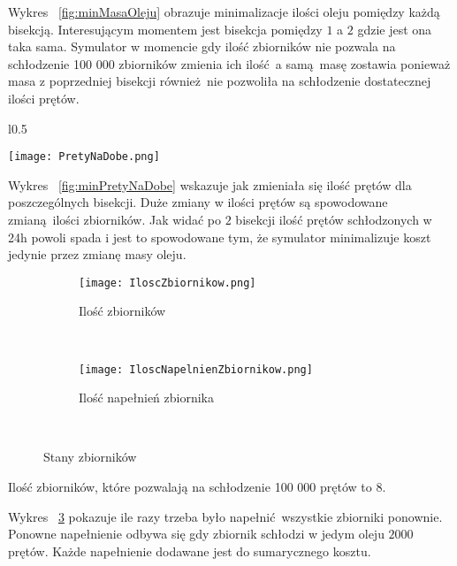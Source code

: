 \documentclass[varwidth,12pt,a4paper]{article}
\begin{document}
Wykres ~\ref{fig:minMasaOleju} obrazuje minimalizacje ilości oleju pomiędzy każdą bisekcją.
Interesującym momentem jest bisekcja pomiędzy $1$ a $2$ gdzie jest ona taka sama. Symulator w momencie 
gdy ilość zbiorników nie pozwala na schłodzenie 100 000 zbiorników zmienia ich ilość a samą masę
zostawia ponieważ masa z poprzedniej bisekcji również nie pozwoliła na schłodzenie dostatecznej
ilości prętów.
\newpage

\afterpage{\clearpage}

\begin{wrapfigure}{l}{0.5\textwidth}
  \begin{center}
    \texttt{[image: PretyNaDobe.png]}
  \end{center}
  \caption{Ilość prętów na dobę}
  \label{fig:minPretyNaDobe}
\end{wrapfigure}

Wykres ~\ref{fig:minPretyNaDobe} wskazuje jak zmieniała się ilość prętów dla poszczególnych bisekcji.
Duże zmiany w ilości prętów są spowodowane zmianą ilości zbiorników. Jak widać po $2$ bisekcji 
ilość prętów schłodzonych w 24h powoli spada i jest to spowodowane tym, że symulator minimalizuje koszt
jedynie przez zmianę masy oleju. 

\begin{figure}
    \centering
    \begin{subfigure}[b]{0.4\textwidth}
        \texttt{[image: IloscZbiornikow.png]}
        \caption{Ilość zbiorników}
        \label{fig:minIloscZbiornikow}
    \end{subfigure}
    ~ %
    \begin{subfigure}[b]{0.4\textwidth}
        \texttt{[image: IloscNapelnienZbiornikow.png]}
        \caption{Ilość napełnień zbiornika}
        \label{fig:minIloscNapelnien}
    \end{subfigure}
    ~ %
    \caption{Stany zbiorników}
\end{figure}

Ilość zbiorników, które pozwalają na schłodzenie 100 000 prętów to $8$. 

Wykres ~\ref{fig:minIloscNapelnien} pokazuje ile razy trzeba było napełnić wszystkie zbiorniki ponownie.
Ponowne napełnienie odbywa się gdy zbiornik schłodzi w jedym oleju $2000$ prętów.
Każde napełnienie dodawane jest do sumarycznego kosztu.
\end{document}
